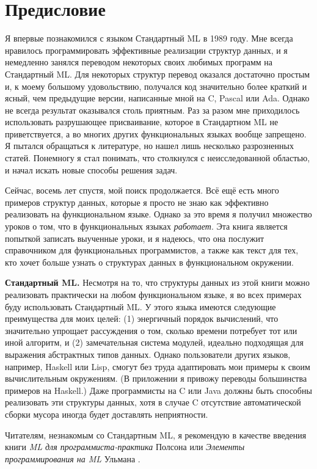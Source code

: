 \chapter*{Предисловие}

Я впервые познакомился с языком Стандартный ML в 1989 году. Мне всегда
нравилось программировать эффективные реализации структур данных,
и я немедленно занялся переводом некоторых своих любимых программ
на Стандартный ML. Для некоторых структур перевод оказался достаточно
простым и, к моему большому удовольствию, получался код значительно более краткий
и ясный, чем предыдущие версии, написанные мной на C, Pascal или
Ada.  Однако не всегда результат оказывался столь приятным. Раз за
разом мне приходилось использовать разрушающее присваивание, которое в
Стандартном ML не приветствуется, а во многих других функциональных
языках вообще запрещено.  Я пытался обращаться к литературе, но
нашел лишь несколько разрозненных статей.  Понемногу я стал понимать,
что столкнулся с неисследованной областью, и начал искать новые
способы решения задач.

Сейчас, восемь лет спустя, мой поиск продолжается. Всё ещё есть много
примеров структур данных, которые я просто не знаю как эффективно
реализовать на функциональном языке. Однако за это время я получил
множество уроков о том, что в функциональных языках
\textit{работает}.  Эта книга является попыткой записать выученные
уроки, и я надеюсь, что она послужит справочником для функциональных
программистов, а также как текст для тех, кто хочет больше узнать о
структурах данных в функциональном окружении.

\textbf{Стандартный ML.} Несмотря на то, что структуры данных из этой
книги можно реализовать практически на любом функциональном языке, я
во всех примерах буду использовать Стандартный ML.  У этого языка
имеются следующие преимущества для моих целей: (1) энергичный
порядок вычислений, что значительно упрощает рассуждения о том,
сколько времени потребует тот или иной алгоритм, и (2) замечательная
система модулей, идеально подходящая для выражения абстрактных типов
данных.  Однако пользователи других языков, например, Haskell или
Lisp, смогут без труда адаптировать мои примеры к своим вычислительным
окружениям. (В приложении я привожу переводы большинства примеров на
Haskell.) Даже программисты на C или Java должны быть способны
реализовать эти структуры данных, хотя в случае C отсутствие
автоматической сборки мусора иногда будет доставлять неприятности.

Читателям, незнакомым со Стандартным ML, я рекомендую в качестве
введения книги \textit{ML для программиста-практика} Полсона
\cite{Paulson1996} или \textit{Элементы программирования на ML}
Ульмана \cite{Ullman1994}.

